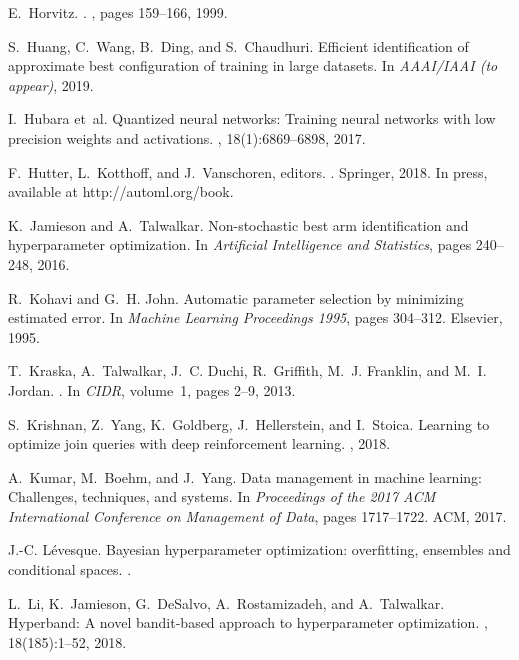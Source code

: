 \documentclass[11pt,dvipdfmx]{article}
\begin{document}
{\begin{thebibliography}{10}
E.~Horvitz.
.
, pages 159--166, 1999.

S.~Huang, C.~Wang, B.~Ding, and S.~Chaudhuri.
\newblock Efficient identification of approximate best configuration of
  training in large datasets.
\newblock In {\em AAAI/IAAI (to appear)}, 2019.

I.~Hubara et~al.
\newblock Quantized neural networks: Training neural networks with low
  precision weights and activations.
, 18(1):6869--6898, 2017.

F.~Hutter, L.~Kotthoff, and J.~Vanschoren, editors.
.
\newblock Springer, 2018.
\newblock In press, available at http://automl.org/book.

K.~Jamieson and A.~Talwalkar.
\newblock Non-stochastic best arm identification and hyperparameter
  optimization.
\newblock In {\em Artificial Intelligence and Statistics}, pages 240--248,
  2016.

R.~Kohavi and G.~H. John.
\newblock Automatic parameter selection by minimizing estimated error.
\newblock In {\em Machine Learning Proceedings 1995}, pages 304--312. Elsevier,
  1995.

T.~Kraska, A.~Talwalkar, J.~C. Duchi, R.~Griffith, M.~J. Franklin, and M.~I.
  Jordan.
.
\newblock In {\em CIDR}, volume~1, pages 2--9, 2013.

S.~Krishnan, Z.~Yang, K.~Goldberg, J.~Hellerstein, and I.~Stoica.
\newblock Learning to optimize join queries with deep reinforcement learning.
, 2018.

A.~Kumar, M.~Boehm, and J.~Yang.
\newblock Data management in machine learning: Challenges, techniques, and
  systems.
\newblock In {\em Proceedings of the 2017 ACM International Conference on
  Management of Data}, pages 1717--1722. ACM, 2017.

J.-C. L{\'e}vesque.
\newblock Bayesian hyperparameter optimization: overfitting, ensembles and
  conditional spaces.
.

L.~Li, K.~Jamieson, G.~DeSalvo, A.~Rostamizadeh, and A.~Talwalkar.
\newblock Hyperband: A novel bandit-based approach to hyperparameter
  optimization.
, 18(185):1--52, 2018.


\end{thebibliography}}
\end{document}
